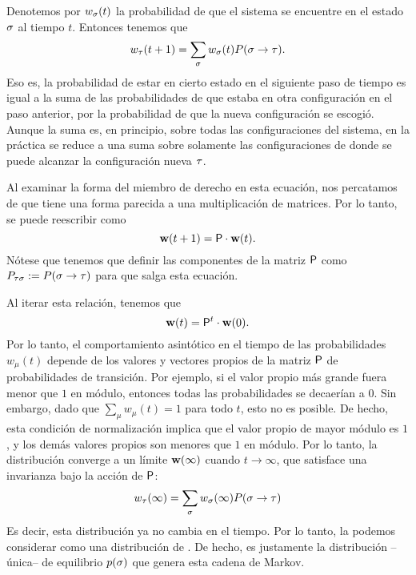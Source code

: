 Denotemos por $w_\ss(t)$ la probabilidad de que el sistema se encuentre en el estado $\ss$ al tiempo $t$. Entonces tenemos que
\begin{equation}
 w_\tt(t+1) = \sum_{\ss} w_\ss(t) P(\ss \to \tt).
\end{equation}
Eso es, la probabilidad de estar en cierto estado en el siguiente paso de tiempo es igual a la suma de las probabilidades de que estaba en otra configuración en el paso anterior, por la probabilidad de que la nueva configuración se escogió.
Aunque la suma es, en principio, sobre todas las configuraciones del sistema, en la práctica se reduce a una suma sobre solamente las configuraciones de donde se puede alcanzar la configuración nueva $\tt$. 

Al examinar la forma del miembro de derecho en esta ecuación, nos percatamos de que tiene una forma parecida a una multiplicación de matrices. Por lo tanto, se puede reescribir como
\begin{equation}
 \ww(t+1) = \PP \cdot \ww(t).
\end{equation}
Nótese que tenemos que definir las componentes de la matriz $\PP$ como $P_{\tt \ss} \defeq P(\ss \to \tt)$ para que salga esta ecuación.

Al iterar esta relación, tenemos que
\begin{equation}
 \ww(t) = \PP^t \cdot \ww(0).
\end{equation}
Por lo tanto, el comportamiento asintótico en el tiempo de las probabilidades $w_\mu(t)$ depende de los valores y vectores propios de la matriz $\PP$ de probabilidades de transición.  Por ejemplo, si el valor propio más grande fuera menor que $1$ en módulo, entonces todas las probabilidades se decaerían a $0$. Sin embargo, dado que $\sum_\mu w_\mu(t) = 1$ para todo $t$, esto no es posible.
De hecho, esta condición de normalización implica que el valor propio de mayor módulo es $1$, y los demás valores propios son menores que $1$ en módulo.  Por lo tanto, la distribución converge a un límite $\ww(\infty)$ cuando $t \to \infty$, que satisface una invarianza bajo la acción de $\PP$:
\begin{equation}
w_\tt(\infty) = \sum_\ss w_\ss(\infty) P(\ss \to \tt)
\label{eq:eqm-distn-w}
\end{equation}
Es decir, esta distribución ya no cambia en el tiempo. Por lo tanto, la podemos considerar como una distribución de .
De hecho, es justamente la distribución --única-- de equilibrio $p(\ss)$ que genera esta cadena de Markov.


